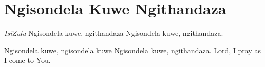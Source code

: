 \starttocol
\chapter{Ngisondela Kuwe Ngithandaza}
\nexttocol
\hfill{\it IsiZulu}
\stoptocol
\starttocol
\startlines
N{\sc gisondela} kuwe, ngithandaza
Ngisondela kuwe, ngithandaza.

Ngisondela kuwe, ngisondela kuwe
Ngisondela kuwe, ngithandaza.
\stoplines
\nexttocol
Lord, I pray as I come to You.
\stoptocol
